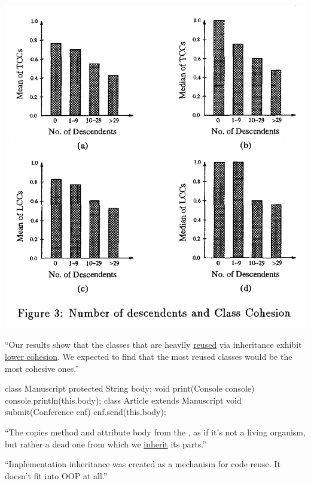 \documentclass{article}
\begin{document}
\begin{multicols}{2}
\includegraphics[width=.9\columnwidth]{graphs.png}
\par\columnbreak\par
``Our results show that the classes that are heavily \ul{reused} via inheritance exhibit \ul{lower cohesion}. We expected to find that the most reused classes would be the most cohesive ones.''\par
{}
\end{multicols}
\plush{}

\begin{multicols}{2}
{\small\begin{ffcode}
class Manuscript {
  protected String body;
  void print(Console console) {
    console.println(this.body);
  }
}
class Article
  extends Manuscript {
  void submit(Conference cnf) {
    cnf.send(this.body);
  }
}
\end{ffcode}
}
\par\columnbreak\par
\begin{spacing}{0.9}
``The  copies method  and attribute body from the , as if it’s not a living organism, but rather a dead one from which we \ul{inherit} its parts.''\par
``Implementation inheritance was created as a mechanism for code reuse. It doesn't fit into OOP at all.''\par
{}
\end{spacing}
\end{multicols}
\plush{}
\end{document}

